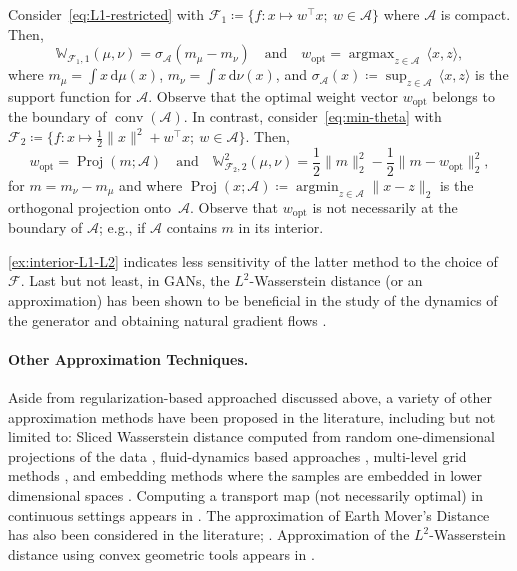 \documentclass[10pt]{article}
\newcommand{\ud}{\,\mathrm{d}}
\newcommand{\op}[1]{\operatorname{#1}}
\newcommand{\norm}[1]{\|#1\|}
\newcommand{\argmax}{\mathop{\operatorname{argmax}}}
\newcommand{\argmin}{\mathop{\operatorname{argmin}}}
\newcommand{\W}{\mathds{W}}
\newcommand{\calF}{\mathcal{F}}
\numberwithin{equation}{section}
\begin{document}
\begin{example}\label{ex:interior-L1-L2}
Consider~\eqref{eq:L1-restricted} with $\calF_1\coloneqq \{f:x\mapsto w^\top x;~w\in\mathcal{A}\}$ where $\mathcal{A}$ is compact. Then, 
\[\W_{\calF_1,1}(\mu,\nu) = \sigma_{\mathcal{A}} (m_\mu-m_\nu) \quad\text{and}\quad
w_{\op{opt}}= \argmax_{z\in \mathcal{A}} \,\langle x,z\rangle,\] 
where $m_\mu = \int x \ud \mu(x)$, $m_\nu = \int x \ud \nu(x)$, 
and $\sigma_{\mathcal{A}}(x) \coloneqq \sup_{z\in \mathcal{A}} \,\langle x,z\rangle$ is the support function for $\mathcal{A}$. 
Observe that the optimal weight vector $w_{\op{opt}}$ belongs to the boundary of $\op{conv}(\mathcal{A})$. In contrast, consider~\eqref{eq:min-theta} with $\calF_2\coloneqq\{f:x\mapsto \frac{1}{2}\norm{x}^2+ w^\top x;~w \in \mathcal{A}\}$. Then, 
\[w_{\op{opt}}= \op{Proj}( m; \mathcal{A}) %
\quad\text{and}\quad\W_{\calF_2,2}^2(\mu,\nu) = \frac{1}{2}\|m\|_2^2 - \frac{1}{2}\|m - w_{\op{opt}} \|_2^2,\] for $m = m_\nu - m_\mu$ and where 
$\op{Proj}(x;\mathcal{A}) \coloneqq \argmin_{z\in\mathcal{A}}\|x-z\|_2$ is the orthogonal projection onto~$\mathcal{A}$. Observe that $w_{\op{opt}}$ is not necessarily at the boundary of $\mathcal{A}$; e.g., if $\mathcal{A}$ contains $m$ in its interior. 
\end{example}
\autoref{ex:interior-L1-L2} indicates less sensitivity of the latter method to the choice of $\calF$. Last but not least, in GANs, the $L^2$-Wasserstein distance (or an approximation) has been shown to be beneficial in the study of the dynamics of the generator and obtaining natural gradient flows \citep{lin2019wasserstein,jacob*2019wgan}.


\paragraph{Other Approximation Techniques.} 
Aside from regularization-based approached discussed above, a variety of other approximation methods have been proposed in the literature, including but not limited to: Sliced Wasserstein distance computed from random one-dimensional projections of the data \citep{rabin2011wasserstein,bonneel2015sliced}, fluid-dynamics based approaches \citep{benamou2000computational}, multi-level grid methods \citep{liu2018multilevel}, and embedding methods where the samples are embedded in lower dimensional spaces \citep{courty2017learning}. Computing a transport map (not necessarily optimal) in continuous settings appears in \citet{el2012bayesian,heng2015gibbs,mesa2018distributed}. The approximation of Earth Mover's Distance has also been considered in the literature; \citep{indyk2003fast,shirdhonkar2008approximate}.
%
Approximation of the $L^2$-Wasserstein distance using convex geometric tools appears in \citet{lei2018geometric}. 
\end{document}
